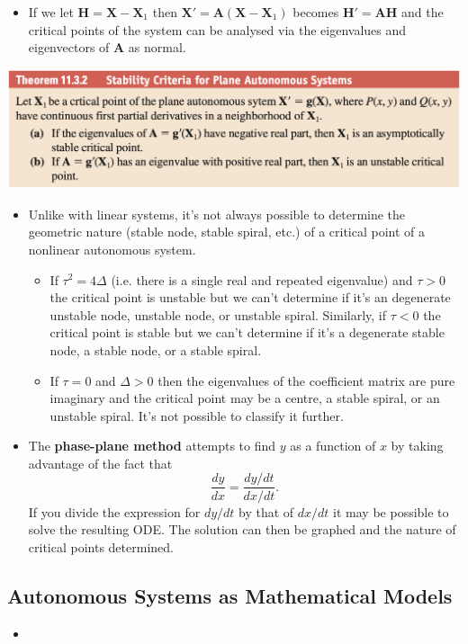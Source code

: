 \documentclass{article}
\begin{document}
\begin{itemize}
  \item If we let $\mathbf{H} = \mathbf{X} - \mathbf{X}_1$ then $\mathbf{X}' = \mathbf{A} (\mathbf{X} - \mathbf{X}_1)$ becomes $\mathbf{H}' = \mathbf{A} \mathbf{H}$ and the critical points of the system can be analysed via the eigenvalues and eigenvectors of $\mathbf{A}$ as normal.
\end{itemize}

\noindent
\includegraphics[scale=0.47]{stability-criteria-for-plane-systems}

\begin{itemize}
  \item Unlike with linear systems, it's not always possible to determine the geometric nature (stable node, stable spiral, etc.) of a critical point of a nonlinear autonomous system.

        \begin{itemize}
          \item If $\tau^2 = 4 \Delta$ (i.e. there is a single real and repeated eigenvalue) and $\tau > 0$ the critical point is unstable but we can't determine if it's an degenerate unstable node, unstable node, or unstable spiral. Similarly, if $\tau < 0$ the critical point is stable but we can't determine if it's a degenerate stable node, a stable node, or a stable spiral.

          \item If $\tau = 0$ and $\Delta > 0$ then the eigenvalues of the coefficient matrix are pure imaginary and the critical point may be a centre, a stable spiral, or an unstable spiral. It's not possible to classify it further.
        \end{itemize}

  \item The \textbf{phase-plane method} attempts to find $y$ as a function of $x$ by taking advantage of the fact that \[\frac{d y}{d x} = \frac{d y / d t}{d x / d t}.\] If you divide the expression for $d y / d t$ by that of $d x / d t$ it may be possible to solve the resulting ODE. The solution can then be graphed and the nature of critical points determined.
\end{itemize}

\subsection{Autonomous Systems as Mathematical Models}

\begin{itemize}
  \item
\end{itemize}
\end{document}
